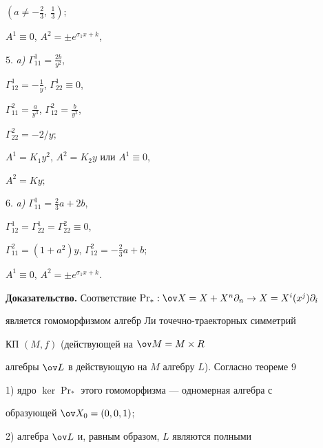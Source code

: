 \begin{thm}
$(a\ne-\frac{2}{3},\ \frac{1}{3});$ 


 


 $A^1\equiv0$, $A^2=\pm e^{\sigma_1x+k}$, 


 


$5.$ {\em a)} $\Gamma^1_{11}=\frac{2b}{y^2}$, 


$\Gamma^1_{12}=-\frac{1}{y}$, $\Gamma^1_{22}\equiv0$, 


$\Gamma^2_{11}=\frac{a}{y^3}$, $\Gamma^2_{12}=\frac{b}{y^2}$, 


$\Gamma^2_{22}=-2/y;$ 


 


 $A^1=K_1y^2$, $A^2=K_2y$ или $A^1\equiv0$, 


$A^2=K{}y;$ 


 


$6.$ {\em a)} $\Gamma^1_{11}=\frac{2}{3}a+2b$, 


$\Gamma^1_{12}=\Gamma^1_{22}=\Gamma^2_{22}\equiv0$, 


$\Gamma^2_{11}=(1+a^2)y$, $\Gamma^2_{12}=-\frac{2}{3}a+b;$ 


 


 $A^1\equiv0$, $A^2=\pm e^{\sigma_1x+k}$. 


\end{thm} 


 


{\bf Доказательство.} Соответствие $\Pr_*:\ov X=X+X^n\partial_n\to 


X=X^i(x^j)\partial_i$ 


является гомоморфизмом алгебр Ли точечно-траекторных симметрий 


КП $(M,f)$ (действующей на $\ov M=M\times R$ 


алгебры $\ov L$ в действующую на $M$ алгебру $L$). Согласно теореме 9 


 


1) ядро $\ker\Pr_*$ этого гомоморфизма --- одномерная алгебра с 


образующей $\ov X_0=(0,0,1)$; 


 


2) алгебра $\ov L$ и, равным образом, $L$ являются полными 


